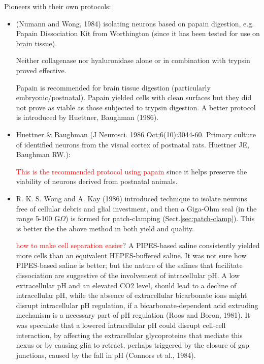 Pioneers with their own protocols:
\begin{itemize}

  \item  (Numann and Wong, 1984) isolating neurons based on papain digestion,
  e.g.  Papain Dissociation Kit from Worthington (since it has been tested for
  use on brain tissue).

Neither collagenase nor hyaluronidase alone or in combination with trypsin
proved effective.

Papain is recommended for brain tissue digestion (particularly
embryonic/postnatal).  Papain yielded cells with clean surfaces but they did not
prove as viable as those subjected to trypsin digestion. A better protocol is
introduced by Huettner, Baughman (1986).


  \item Huettner \& Baughman (J Neurosci. 1986 Oct;6(10):3044-60.  Primary
  culture of identified neurons from the visual cortex of postnatal rats.
  Huettner JE, Baughman RW.):

\textcolor{red}{This is the recommended protocol using papain} since it helps
preserve the viability of neurons derived from postnatal animals.

  \item  R. K. S. Wong and A. Kay (1986) introduced technique to isolate neurons
free of cellular debris and glial investment, and then a Giga-Ohm seal (in the
range 5-100 G$\Omega$) is formed for patch-clamping
(Sect.\ref{sec:patch-clamp}). This is better the the above method in both yield and quality.

\textcolor{red}{how to make cell separation easier}? A PIPES-based saline
consistently yielded more cells than an equivalent HEPES-buffered saline. It was
not sure how PIPES-based saline is better; but the nature of the salines that
facilitate dissociation are suggestive of the involvement of intracellular pH. A
low extracellular pH and an elevated CO2 level, should lead to a decline of
intracellular pH, while the absence of extracellular bicarbonate ions might
disrupt intracellular pH regulation, if a bicarbonate-dependent acid extruding
mechanism is a necessary part of pH regulation (Roos and Boron, 1981).
It was speculate that a lowered intracellular pH could disrupt cell-cell
interaction, by affecting the extracellular glycoproteins that mediate this
nexus or by causing glia to retract, perhaps triggered by the closure of gap
junctions, caused by the fall in pH (Connors et al., 1984).


\end{itemize}
